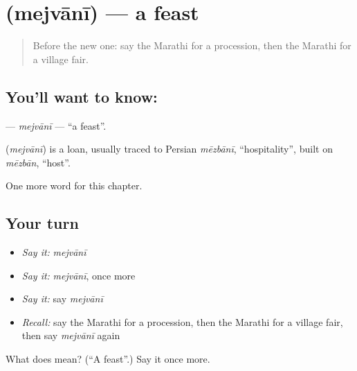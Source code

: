 \section[\texorpdfstring{\mr{मेजवानी} (mejvānī)}{मेजवानी (mejvānī)}]{ (mejvānī) — a feast}

\label{lesson:MR-C248-mejvani}



\begin{quote}
Before the new one: say the Marathi for a procession, then the Marathi for a village fair.
\end{quote}

\subsection*{You'll want to know: }
\textbf{} — \emph{mejvānī} — \textquotedblleft{}a feast\textquotedblright{}.

\begin{cousinweb}
\textbf{} (\emph{mejvānī}) is a loan, usually traced to Persian \emph{mēzbānī}, \textquotedblleft{}hospitality\textquotedblright{}, built on \emph{mēzbān}, \textquotedblleft{}host\textquotedblright{}.
\end{cousinweb}

\begin{grammarlens}[title={What you've built}]
One more word for this chapter.
\end{grammarlens}

\subsection*{Your turn}
\begin{itemize}
\raggedright
  \item \emph{Say it:} \emph{mejvānī}
  \item \emph{Say it:} \emph{mejvānī}, once more
  \item \emph{Say it:} say \emph{mejvānī}
  \item \emph{Recall:} say the Marathi for a procession, then the Marathi for a village fair, then say \emph{mejvānī} again
\end{itemize}

\begin{tcolorbox}[breakable,colback=teal!4,colframe=teal!35!black,title={Before you move on}]
What does  mean? (\textquotedblleft{}A feast\textquotedblright{}.) Say it once more.
\end{tcolorbox}
